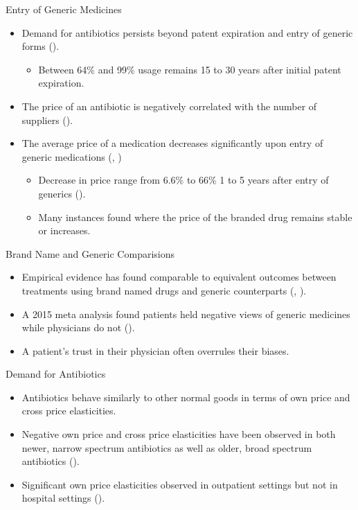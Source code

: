 \documentclass{beamer}
\begin{document}
\begin{frame}{Entry of Generic Medicines}
\begin{itemize}
\item Demand for antibiotics persists beyond patent expiration and entry of generic forms (\cite{mansley_utilization_2008}).
\begin{itemize}
  \item Between 64\% and 99\% usage remains 15 to 30 years after initial patent expiration.
\end{itemize}
\item The price of an antibiotic is negatively correlated with the number of suppliers (\cite{alpern_trends_2017}).
\item The average price of a medication decreases significantly upon entry of generic medications (\cite{frank_generic_1997}, \cite{grabowski_brand_1992})
\begin{itemize}
  \item Decrease in price range from 6.6\% to 66\% 1 to 5 years after entry of generics (\cite{vondeling_impact_2018}).
  \item Many instances found where the price of the branded drug remains stable or increases.
\end{itemize}
\end{itemize}
\end{frame}

\begin{frame}{Brand Name and Generic Comparisions}
\begin{itemize}
\item Empirical evidence has found comparable to equivalent outcomes between treatments using brand named drugs and generic counterparts (\cite{lin_comparative_2017}, \cite{desai_comparative_2019}).
\item A 2015 meta analysis found patients held negative views of generic medicines while physicians do not (\cite{dunne_what_2015}).
\item A patient's trust in their physician often overrules their biases.
\end{itemize}
\end{frame}

\begin{frame}{Demand for Antibiotics}
\begin{itemize}
\item Antibiotics behave similarly to other normal goods in terms of own price and cross price elasticities.
\item Negative own price and cross price elasticities have been observed in both newer, narrow spectrum antibiotics as well as older, broad spectrum antibiotics (\cite{kianmehr_system_2020}).
\item Significant own price elasticities observed in outpatient settings but not in hospital settings (\cite{kaier_impact_2013}).
\end{itemize}
\end{frame}
\end{document}
